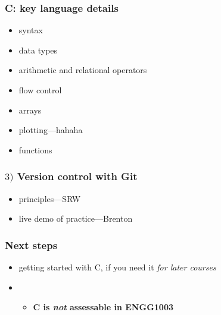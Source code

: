 \documentclass[english,14pt]{beamer}
\begin{document}
\begin{frame}[fragile]

\frametitle{C: key language details}

\begin{itemize}
	\item syntax
	\item data types
	\item arithmetic and relational operators
	\item flow control
	\item arrays
	\item plotting---hahaha
	\item functions
\end{itemize}


\end{frame}


\begin{frame}[fragile]

\frametitle{$3)$ Version control with Git}

\begin{itemize}
	\item principles---SRW
	\item live demo of practice---Brenton
\end{itemize}

\end{frame}


\begin{frame}[fragile]

\frametitle{Next steps}
\begin{itemize}
	\item getting started with C, if you need it \emph{for later courses}
	\item[]
	\begin{itemize}
		\item \textbf{C is \emph{not} assessable in ENGG1003}
	\end{itemize}
\end{itemize}
	
\end{frame}
\end{document}
